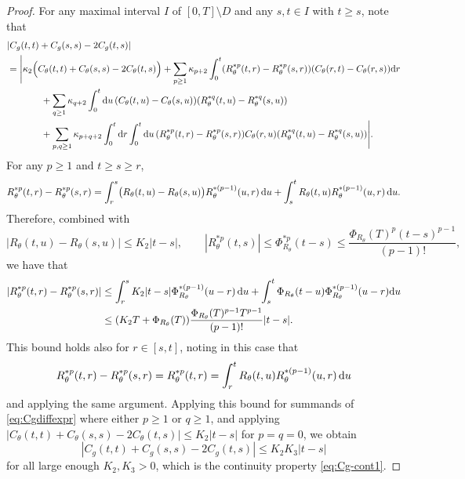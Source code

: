 \begin{proof}
For any maximal interval $I$ of $[0,T] \setminus D$ and any $s,t \in I$
with $t \geq s$, note that
\begin{align}
&|C_g(t,t)+C_g(s,s)-2C_g(t,s)|\notag\\
&=\Bigg|\kappa_2\Big(C_\theta(t,t)+C_\theta(s,s)-2C_\theta(t,s)\Big)
+\sum_{p\ge 1}
  \kappa_{p+2}
  \int_0^t (R_\theta^{\ast p}(t,r)-R_\theta^{\ast p}(s,r))(C_\theta(r,t)
-C_\theta(r,s))\mathrm{d} r \notag\\
&\hspace{0.5in}+ \sum_{q\ge 1}
  \kappa_{q+2}
  \int_0^t \mathrm{d} u\,
  (C_\theta(t,u)-C_\theta(s,u))
(R_\theta^{\ast q}(t,u)-R_\theta^{\ast q}(s,u))\notag\\
&\hspace{0.5in}+\sum_{p,q\ge 1}
  \kappa_{p+q+2}
  \int_0^t \mathrm{d} r \int_0^t \mathrm{d} u\,
    (R_\theta^{\ast p}(t,r)-R_\theta^{\ast p}(s,r))C_\theta(r,u)
    (R_\theta^{\ast q}(t,u)-R_\theta^{\ast q}(s,u))\Bigg|.\label{eq:Cgdiffexpr}
\end{align}
For any \(p\ge 1\) and $t \ge s\ge r$,
\[
R_\theta^{\ast p}(t,r)-R_\theta^{\ast p}(s,r)
=
\int_r^s
\bigl(R_\theta(t,u)-R_\theta(s,u)\bigr)
R_\theta^{\ast(p-1)}(u,r)\,\mathrm{d} u+
\int_s^t
R_\theta(t,u)R_\theta^{\ast(p-1)}(u,r)\,\mathrm{d} u.
\]
Therefore, combined with 
\[
|R_\theta(t,u) - R_\theta(s,u)| \leq K_2 |t-s|, \qquad |R_\theta^{\ast p}(t,s)| \le \Phi_{R_\theta}^{\ast p}(t-s) \le \frac{\Phi_{R_\theta}(T)^p (t-s)^{p-1}}{(p-1)!},
\]
we have that
\begin{align*}
|R_\theta^{\ast p}(t,r)-R_\theta^{\ast p}(s,r)|
&\le \int_r^s
K_2|t-s|
\Phi_{R_\theta}^{\ast (p-1)}(u-r)\,\mathrm{d} u 
+
\int_s^t \Phi_{R_\theta}(t-u)\Phi_{R_\theta}^{\ast (p-1)}(u-r)
 \mathrm{d} u\\
 &\le (K_2T+\Phi_{R_\theta}(T)) \frac{\Phi_{R_\theta}(T)^{p-1}T^{p-1}}{(p-1)!} |t-s|. 
\end{align*}
This bound holds also for $r \in [s,t]$, noting in this case that
\[R_\theta^{\ast p}(t,r)-R_\theta^{\ast p}(s,r)
=R_\theta^{\ast p}(t,r)=\int_r^t R_\theta(t,u)R_\theta^{*(p-1)}(u,r)\,\mathrm{d} u\]
and applying the same argument. Applying this bound for summands of
\eqref{eq:Cgdiffexpr} where either $p \geq 1$ or $q \geq 1$, and applying
$|C_\theta(t,t)+C_\theta(s,s)-2C_\theta(t,s)| \leq K_2|t-s|$
for $p=q=0$, we obtain
\[|C_g(t,t)+C_g(s,s)-2C_g(t,s)| \leq K_2K_3|t-s|\]
for all large enough $K_2,K_3>0$, which is the continuity property
\eqref{eq:Cg-cont1}.


\end{proof}

